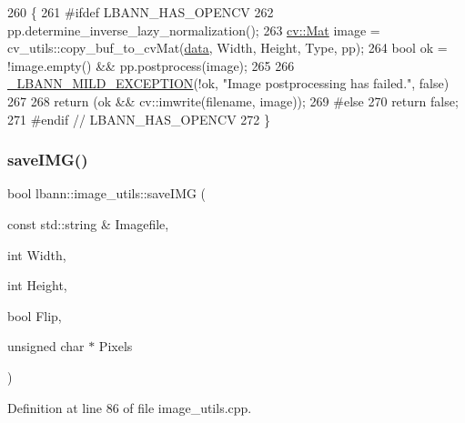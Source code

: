 \begin{DoxyCode}
260                                                                                                            
                   \{
261 \textcolor{preprocessor}{#ifdef LBANN\_HAS\_OPENCV}
262   pp.determine\_inverse\_lazy\_normalization();
263   \hyperlink{base_8hpp_a68f11fdc31b62516cb310831bbe54d73}{cv::Mat} image = cv\_utils::copy\_buf\_to\_cvMat(\hyperlink{namespacelbann_1_1cnpy__utils_a9ac86d96ccb1f8b4b2ea16441738781f}{data}, Width, Height, Type, pp);
264   \textcolor{keywordtype}{bool} ok = !image.empty() && pp.postprocess(image);
265 
266   \hyperlink{mild__exception_8hpp_a7b8339c566152ab29ce66b63e90c67f9}{\_LBANN\_MILD\_EXCEPTION}(!ok, \textcolor{stringliteral}{"Image postprocessing has failed."}, \textcolor{keyword}{false})
267 
268   return (ok && cv::imwrite(filename, image));
269 \textcolor{preprocessor}{#else}
270   \textcolor{keywordflow}{return} \textcolor{keyword}{false};
271 \textcolor{preprocessor}{#endif // LBANN\_HAS\_OPENCV}
272 \}
\end{DoxyCode}
\mbox{\label{classlbann_1_1image__utils_a215ea7f6ac4ddb38f7e2b5c7b5ea1420}} 
\subsubsection{\texorpdfstring{save\+I\+M\+G()}{saveIMG()}}
{\footnotesize\ttfamily bool lbann\+::image\+\_\+utils\+::save\+I\+MG (\begin{DoxyParamCaption}\item[{const std\+::string \&}]{Imagefile,  }\item[{int}]{Width,  }\item[{int}]{Height,  }\item[{bool}]{Flip,  }\item[{unsigned char $\ast$}]{Pixels }\end{DoxyParamCaption})\hspace{0.3cm}{\ttfamily [static]}}



Definition at line 86 of file image\+\_\+utils.\+cpp.


